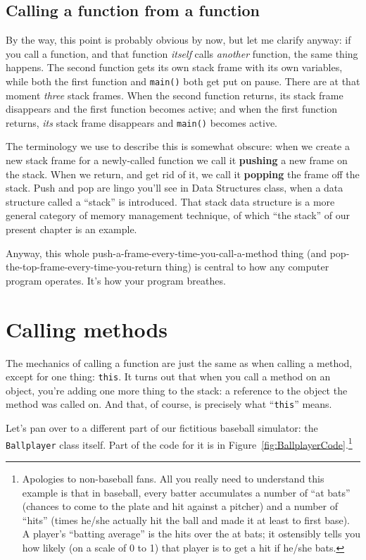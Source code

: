 \subsection{Calling a function from a function}

By the way, this point is probably obvious by now, but let me clarify anyway:
if you call a function, and that function \textit{itself} calls
\textit{another} function, the same thing happens. The second function gets
its own stack frame with its own variables, while both the first function and
\texttt{main()} both get put on pause. There are at that moment \textit{three}
stack frames. When the second function returns, its stack frame disappears and
the first function becomes active; and when the first function returns,
\textit{its} stack frame disappears and \texttt{main()} becomes active.

The terminology we use to describe this is somewhat obscure: when we create a
new stack frame for a newly-called function we call it \textbf{pushing} a new
frame on the stack. When we return, and get rid of it, we call it
\textbf{popping} the frame off the stack. Push and pop are lingo you'll see in
Data Structures class, when a data structure called a ``stack'' is introduced.
That stack data structure is a more general category of memory management
technique, of which ``the stack'' of our present chapter is an example.

Anyway, this whole push-a-frame-every-time-you-call-a-method thing (and
pop-the-top-frame-every-time-you-return thing) is central to how any computer
program operates. It's how your program breathes.


\section{Calling methods}

The mechanics of calling a function are just the same as when calling a
method, except for one thing: \texttt{this}. It turns out that when you call a
method on an object, you're adding one more thing to the stack: a reference to
the object the method was called on. And that, of course, is precisely what
``\texttt{this}'' means.

Let's pan over to a different part of our fictitious baseball simulator: the
\texttt{Ballplayer} class itself. Part of the code for it is in
Figure~\ref{fig:BallplayerCode}.\footnote{Apologies to non-baseball fans. All
you really need to understand this example is that in baseball, every batter
accumulates a number of ``at bats'' (chances to come to the plate and hit
against a pitcher) and a number of ``hits'' (times he/she actually hit the ball
and made it at least to first base). A player's ``batting average'' is the hits
over the at bats; it ostensibly tells you how likely (on a scale of 0 to 1)
that player is to get a hit if he/she bats.}

